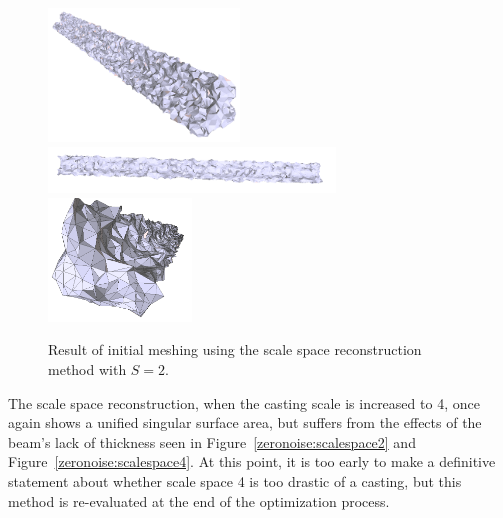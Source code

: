 \documentclass[12pt]{drexelthesis}
\begin{document}
\begin{figure}[!ht] 
	\centering
		\includegraphics[width=2in]{simulated-lab-scan/2cmnoise/2cmmesh/scalespace200.png}
		\includegraphics[width=3in]{simulated-lab-scan/2cmnoise/2cmmesh/scalespace201.png}
		\includegraphics[width=1.5in]{simulated-lab-scan/2cmnoise/2cmmesh/scalespace202.png}
		\caption[Initial meshing using a scale space reconstruction with $S = 2$]{\centering  Result of initial meshing using the scale space reconstruction method with $S = 2$.}
		\label{2cmnoise:scalepspace2}
\end{figure}

The scale space reconstruction, when the casting scale is increased to 4, once again shows a unified singular surface area, but suffers from the effects of the beam's lack of thickness seen in Figure~\ref{zeronoise:scalespace2} and Figure~\ref{zeronoise:scalespace4}. At this point, it is too early to make a definitive statement about whether scale space 4 is too drastic of a casting, but this method is re-evaluated  at the end of the optimization process.
\end{document}

